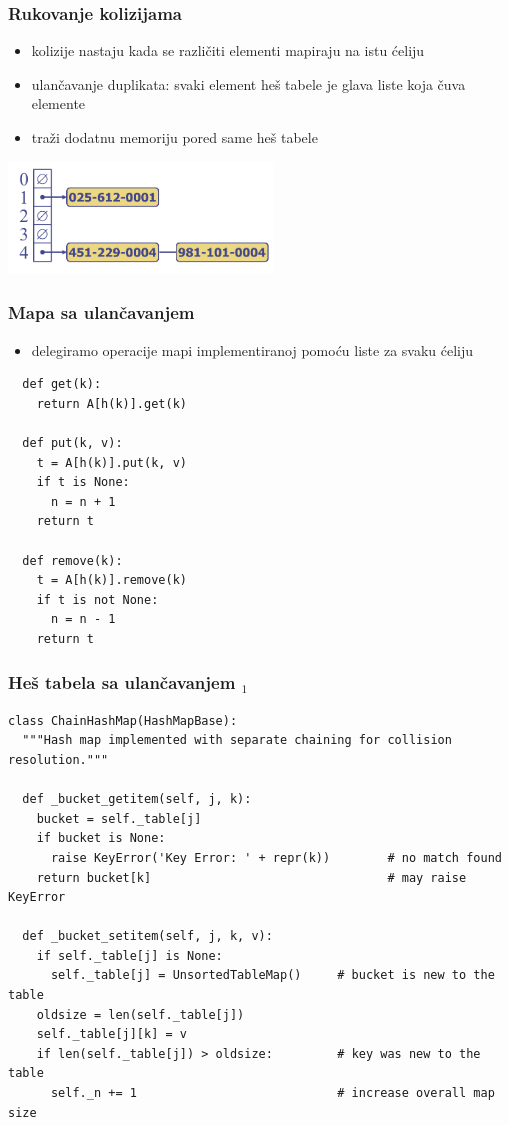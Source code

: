 \documentclass[compress]{beamer}
\begin{document}
\begin{frame}[fragile]
  \frametitle{Rukovanje kolizijama}
  \begin{itemize}
    \item kolizije nastaju kada se različiti elementi mapiraju na istu ćeliju
    \item ulančavanje duplikata: svaki element heš tabele je glava liste koja čuva elemente
    \item traži dodatnu memoriju pored same heš tabele
  \end{itemize}
  \begin{center}
    \includegraphics[width=7cm]{asp-10-pic08.png}
  \end{center}
\end{frame}

\begin{frame}
  \frametitle{Mapa sa ulančavanjem}
  \begin{itemize}
    \item delegiramo operacije mapi implementiranoj pomoću liste za svaku ćeliju
  \end{itemize}
\begin{verbatim}
  def get(k):
    return A[h(k)].get(k)
  
  def put(k, v):
    t = A[h(k)].put(k, v)
    if t is None:
      n = n + 1
    return t
    
  def remove(k):
    t = A[h(k)].remove(k)
    if t is not None:
      n = n - 1
    return t
\end{verbatim}
\end{frame}

\begin{frame}[fragile,shrink=25]
  \frametitle{Heš tabela sa ulančavanjem $_1$}
\begin{verbatim}
class ChainHashMap(HashMapBase):
  """Hash map implemented with separate chaining for collision resolution."""

  def _bucket_getitem(self, j, k):
    bucket = self._table[j]
    if bucket is None:
      raise KeyError('Key Error: ' + repr(k))        # no match found
    return bucket[k]                                 # may raise KeyError

  def _bucket_setitem(self, j, k, v):
    if self._table[j] is None:
      self._table[j] = UnsortedTableMap()     # bucket is new to the table
    oldsize = len(self._table[j])
    self._table[j][k] = v
    if len(self._table[j]) > oldsize:         # key was new to the table
      self._n += 1                            # increase overall map size
\end{verbatim}
\end{frame}
\end{document}
